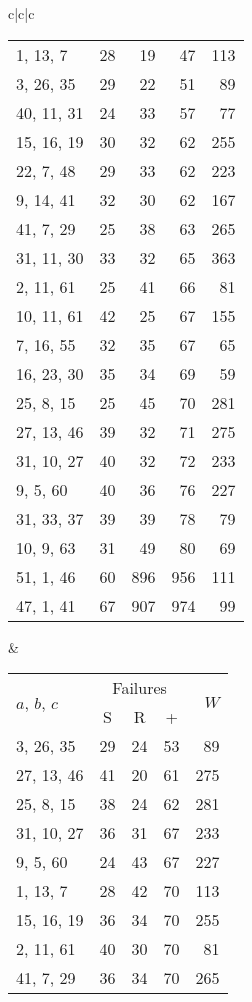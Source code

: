 \documentclass{acmsmalltr}
\newcommand{\xst}[3]{#1, #2, #3}
\begin{document}
\begin{sidewaystable}
{\begin{tabular}{c|c|c}
\begin{tabular}{l|rr|r|r}
\hline
\xst{1}{13}{7} & 28 & 19 & 47 & 113\\
\xst{3}{26}{35} & 29 & 22 & 51 & 89\\
\xst{40}{11}{31} & 24 & 33 & 57 & 77\\
\xst{15}{16}{19} & 30 & 32 & 62 & 255\\
\xst{22}{7}{48} & 29 & 33 & 62 & 223\\
\xst{9}{14}{41} & 32 & 30 & 62 & 167\\
\xst{41}{7}{29} & 25 & 38 & 63 & 265\\
\xst{31}{11}{30} & 33 & 32 & 65 & 363\\
\xst{2}{11}{61} & 25 & 41 & 66 & 81\\
\xst{10}{11}{61} & 42 & 25 & 67 & 155\\
\xst{7}{16}{55} & 32 & 35 & 67 & 65\\
\xst{16}{23}{30} & 35 & 34 & 69 & 59\\
\xst{25}{8}{15} & 25 & 45 & 70 & 281\\
\xst{27}{13}{46} & 39 & 32 & 71 & 275\\
\xst{31}{10}{27} & 40 & 32 & 72 & 233\\
\xst{9}{5}{60} & 40 & 36 & 76 & 227\\
\xst{31}{33}{37} & 39 & 39 & 78 & 79\\
\xst{10}{9}{63} & 31 & 49 & 80 & 69\\
\xst{51}{1}{46} & 60 & 896 & 956 & 111\\
\xst{47}{1}{41} & 67 & 907 & 974 & 99\\
\end{tabular}&
\begin{tabular}{l|rr|r|r}
\multirow{2}{*}{$a$, $b$, $c$} & \multicolumn{3}{c|}{Failures}  & \multirow{2}{*}{$W$}\\
& \multicolumn{1}{c}{S} & \multicolumn{1}{c|}{R} & \multicolumn{1}{c|}{+} \\
\hline
\xst{3}{26}{35} & 29 & 24 & 53 & 89\\
\xst{27}{13}{46} & 41 & 20 & 61 & 275\\
\xst{25}{8}{15} & 38 & 24 & 62 & 281\\
\xst{31}{10}{27} & 36 & 31 & 67 & 233\\
\xst{9}{5}{60} & 24 & 43 & 67 & 227\\
\xst{1}{13}{7} & 28 & 42 & 70 & 113\\
\xst{15}{16}{19} & 36 & 34 & 70 & 255\\
\xst{2}{11}{61} & 40 & 30 & 70 & 81\\
\xst{41}{7}{29} & 36 & 34 & 70 & 265\\

\end{tabular}
\end{tabular}}
\end{sidewaystable}
\end{document}
